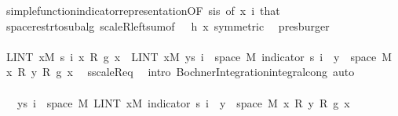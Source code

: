 \begin{isabellebody}
\ simple{\isacharunderscore}{\kern0pt}function{\isacharunderscore}{\kern0pt}indicator{\isacharunderscore}{\kern0pt}representation{\isacharbrackleft}{\kern0pt}OF\ s{\isacharunderscore}{\kern0pt}is{\isacharparenleft}{\kern0pt}{}{\isacharparenright}{\kern0pt}{\isacharcomma}{\kern0pt}\ of\ x\ i{\isacharbrackright}{\kern0pt}\ that\ \isamarkupfalse%
\ space{\isacharunderscore}{\kern0pt}restr{\isacharunderscore}{\kern0pt}to{\isacharunderscore}{\kern0pt}subalg\ scaleR{\isacharunderscore}{\kern0pt}left{\isachardot}{\kern0pt}sum{\isacharbrackleft}{\kern0pt}of\ {\isacharunderscore}{\kern0pt}\ {\isacharunderscore}{\kern0pt}\ {\isachardoublequoteopen}h\ x{\isachardoublequoteclose}{\isacharcomma}{\kern0pt}\ symmetric{\isacharbrackright}{\kern0pt}\ \isamarkupfalse%
\ presburger\isanewline
\ \ \ \ \ \ \ \ \isanewline
\ \ \ \ \ \ \ \ \isamarkupfalse%
\ {\isachardoublequoteopen}LINT\ x{\isacharbar}{\kern0pt}M{\isachardot}{\kern0pt}\ s\ i\ x\ {\isacharasterisk}{\kern0pt}\isactrlsub R\ g\ x\ {\isacharequal}{\kern0pt}\ LINT\ x{\isacharbar}{\kern0pt}M{\isachardot}{\kern0pt}\ {\isacharparenleft}{\kern0pt}{\isasymSum}y{\isasymin}s\ i\ {\isacharbackquote}{\kern0pt}\ space\ M{\isachardot}{\kern0pt}\ indicator\ {\isacharparenleft}{\kern0pt}s\ i\ {\isacharminus}{\kern0pt}{\isacharbackquote}{\kern0pt}\ {\isacharbraceleft}{\kern0pt}y{\isacharbraceright}{\kern0pt}\ {\isasyminter}\ space\ M{\isacharparenright}{\kern0pt}\ x\ {\isacharasterisk}{\kern0pt}\isactrlsub R\ y\ {\isacharasterisk}{\kern0pt}\isactrlsub R\ g\ x{\isacharparenright}{\kern0pt}{\isachardoublequoteclose}\ \isamarkupfalse%
\ s{\isacharunderscore}{\kern0pt}scaleR{\isacharunderscore}{\kern0pt}eq\ \isamarkupfalse%
\ {\isacharparenleft}{\kern0pt}intro\ Bochner{\isacharunderscore}{\kern0pt}Integration{\isachardot}{\kern0pt}integral{\isacharunderscore}{\kern0pt}cong{\isacharparenright}{\kern0pt}\ auto\isanewline
\ \ \ \ \ \ \ \ \isamarkupfalse%
\ \isamarkupfalse%
\ {\isachardoublequoteopen}{\isachardot}{\kern0pt}{\isachardot}{\kern0pt}{\isachardot}{\kern0pt}\ {\isacharequal}{\kern0pt}\ {\isacharparenleft}{\kern0pt}{\isasymSum}y{\isasymin}s\ i\ {\isacharbackquote}{\kern0pt}\ space\ M{\isachardot}{\kern0pt}\ LINT\ x{\isacharbar}{\kern0pt}M{\isachardot}{\kern0pt}\ indicator\ {\isacharparenleft}{\kern0pt}s\ i\ {\isacharminus}{\kern0pt}{\isacharbackquote}{\kern0pt}\ {\isacharbraceleft}{\kern0pt}y{\isacharbraceright}{\kern0pt}\ {\isasyminter}\ space\ M{\isacharparenright}{\kern0pt}\ x\ {\isacharasterisk}{\kern0pt}\isactrlsub R\ y\ {\isacharasterisk}{\kern0pt}\isactrlsub R\ g\ x{\isacharparenright}{\kern0pt}{\isachardoublequoteclose}\ \isamarkupfalse%

\end{isabellebody}
